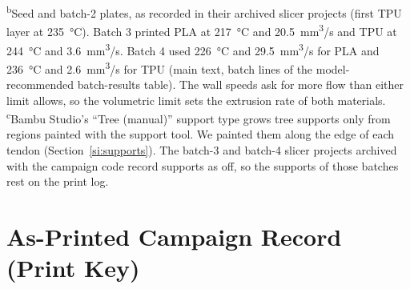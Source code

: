 \documentclass[11pt]{article}
\begin{document}
\begin{table}[ht]
{  \textsuperscript{b}Seed and batch-2 plates, as recorded in their
  archived slicer projects (first TPU layer at \SI{235}{\celsius}).
  Batch 3 printed PLA at \SI{217}{\celsius} and \SI{20.5}{mm^3/s} and
  TPU at \SI{244}{\celsius} and \SI{3.6}{mm^3/s}. Batch 4 used
  \SI{226}{\celsius} and \SI{29.5}{mm^3/s} for PLA and
  \SI{236}{\celsius} and \SI{2.6}{mm^3/s} for TPU (main text, batch lines of
  the model-recommended batch-results table). The wall speeds ask for
  more flow than either limit allows, so the volumetric limit sets the
  extrusion rate of both materials.
  \textsuperscript{c}Bambu Studio's ``Tree (manual)'' support type
  grows tree supports only from regions painted with the support tool.
  We painted them along the edge of each tendon
  (Section~\ref{si:supports}). The batch-3 and batch-4 slicer projects
  archived with the campaign code record supports as off, so the
  supports of those batches rest on the print log.\par}
\end{table}

\section{As-Printed Campaign Record (Print Key)}
\label{si:printkey}
\end{document}
